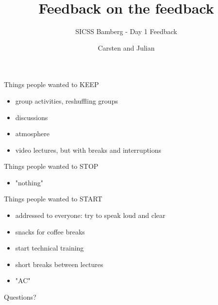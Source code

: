 \documentclass{beamer}
\title{Feedback on the feedback}
\subtitle{SICSS Bamberg - Day 1 Feedback}
\author{Carsten and Julian}
\institute{}
\date{}
\begin{document}
	\maketitle
	
	


\begin{frame}

Things people wanted to KEEP

\begin{itemize}
\item group activities, reshuffling groups
\item discussions
\item atmosphere
\item video lectures, but with breaks and interruptions
\end{itemize}

\end{frame}

\begin{frame}
Things people wanted to STOP

\begin{itemize}
	\item "nothing"
\end{itemize}

\end{frame}
\begin{frame}
Things people wanted to START

\begin{itemize}
	\item addressed to everyone: try to speak loud and clear
	\item snacks for coffee breaks
	\item start technical training
	\item short breaks between lectures
	\item "AC"
	\end{itemize}
		
\end{frame}


\begin{frame}[standout]

\begin{center}
\LARGE
Questions?
\end{center}

\end{frame}
\end{document}
